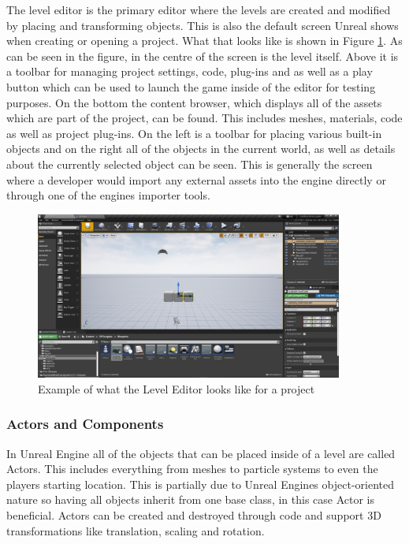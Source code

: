 The level editor is the primary editor where the levels are created and modified by placing and transforming objects. This is also the default screen Unreal shows when creating or opening a project. What that looks like is shown in Figure \ref{fig:LevelEditor}. As can be seen in the figure, in the centre of the screen is the level itself. Above it is a toolbar for managing project settings, code, plug-ins and as well as a play button which can be used to launch the game inside of the editor for testing purposes. On the bottom the content browser, which displays all of the assets which are part of the project, can be found. This includes meshes, materials, code as well as project plug-ins. On the left is a toolbar for placing various built-in objects and on the right all of the objects in the current world, as well as details about the currently selected object can be seen. This is generally the screen where a developer would import any external assets into the engine directly or through one of the engines importer tools.\\

\begin{figure}[htpb]
	\centering
	\includegraphics[width=0.9\textwidth]{fig/UnrealEngineLevelEditor.png}
	\caption[Unreal Engine Level Editor]{Example of what the Level Editor looks like for a project \protect}
	\label{fig:LevelEditor}
\end{figure}

\subsubsection{Actors and Components}

In Unreal Engine all of the objects that can be placed inside of a level are called Actors\cite{bib:UEActors}. This includes everything from meshes to particle systems to even the players starting location. This is partially due to Unreal Engines object-oriented nature so having all objects inherit from one base class, in this case Actor is beneficial. Actors can be created and destroyed through code and support 3D transformations like translation, scaling and rotation.\\

